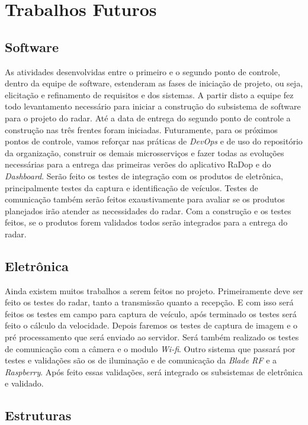 \chapter{Trabalhos Futuros} %
\label{cha:trabalhos-futuros}

\section{Software}

As atividades desenvolvidas entre o primeiro e o segundo ponto de controle, dentro da equipe de software, estenderam as fases de iniciação de projeto, ou seja, elicitação e refinamento de requisitos e dos sistemas. A partir disto a equipe fez todo levantamento necessário para iniciar a construção do subsistema de software para o projeto do radar. Até a data de entrega do segundo ponto de controle a construção nas três frentes foram iniciadas. Futuramente, para os próximos pontos de controle, vamos reforçar nas práticas de \textit{DevOps} e de uso do repositório da organização, construir os demais microsserviços e fazer todas as evoluções necessárias para a entrega das primeiras verões do aplicativo RaDop e do \textit{Dashboard}. Serão feito os testes de integração com os produtos de eletrônica, principalmente testes da captura e identificação de veículos. Testes de comunicação também serão feitos exaustivamente para avaliar se os produtos planejados irão atender as necessidades do radar. Com a construção e os testes feitos, se o produtos forem validados todos serão integrados para a entrega do radar.

\section{Eletrônica}

Ainda existem muitos trabalhos a serem feitos no projeto. Primeiramente deve ser feito os testes do radar, tanto a transmissão quanto a recepção. E com isso será feitos os testes em campo para captura de veículo, após terminado os testes será feito o cálculo da velocidade. Depois faremos os testes de captura de imagem e o pré processamento que será enviado ao servidor. Será também realizado os testes de comunicação com a câmera e o modulo \emph{Wi-fi}. Outro sistema que passará por testes e validações são os de iluminação e de comunicação da \emph{Blade RF} e a \emph{Raspberry}. Após feito essas validações, será integrado os subsistemas de eletrônica e validado.

\section{Estruturas}

